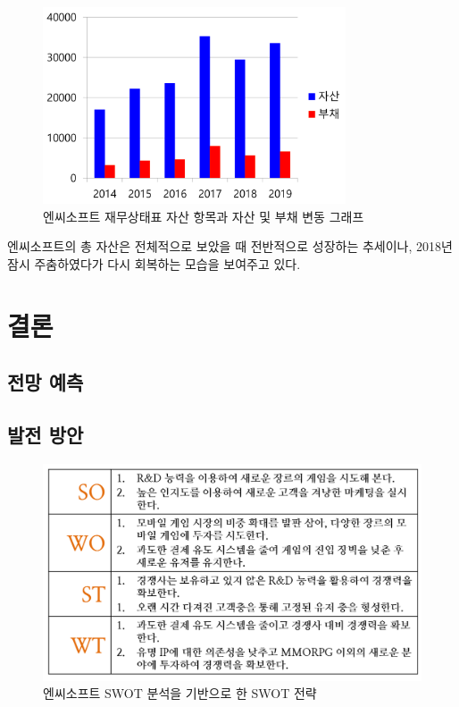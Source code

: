 \documentclass[11pt]{oblivoir}
\begin{document}
		\begin{figure}[htbp]
			\centering
			\includegraphics[width=0.8\textwidth]{Pictures/zaemustate.png}
			\caption{엔씨소프트 재무상태표 자산 항목과 자산 및 부채 변동 그래프}
		\end{figure}
		
		엔씨소프트의 총 자산은 전체적으로 보았을 때 전반적으로 성장하는 추세이나, 2018년 잠시 주춤하였다가 다시 회복하는 모습을 보여주고 있다.
		
	\section{결론}
	
	\subsection{전망 예측}
	
	\subsection{발전 방안}
	\begin{figure}[htbp]
		\centering
		\includegraphics[width=1\textwidth]{Pictures/SWOT2.png}
		\caption{엔씨소프트 SWOT 분석을 기반으로 한 SWOT 전략}
	\end{figure}
	
\end{document}
